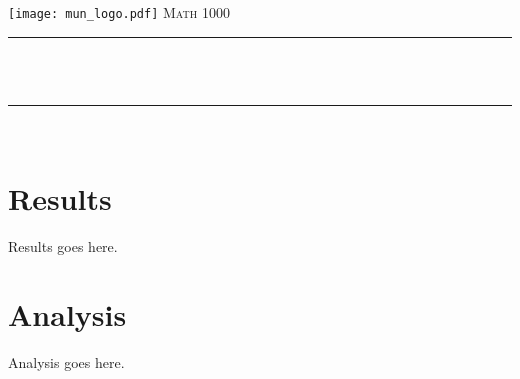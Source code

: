 \documentclass[12pt,oneside,oldfontcommands]{memoir}
\makeatletter
\def\maketitle{%
  \null
  \thispagestyle{empty}
  \begin{center}\leavevmode
       \normalfont
       \texttt{[image: mun\_logo.pdf]}
       \vskip 0.5cm   
       \textsc{\Large Math 1000}\\[0.5 cm]
	     {\large \@date\par}
       \vskip 1.0cm
	\rule{\linewidth}{0.2 mm} \\[0.4 cm]
	{ \huge \bfseries \@title}\\
	\rule{\linewidth}{0.2 mm} \\[1.5 cm]
   \end{center}
   \vfill
   \null
   \cleardoublepage
  }
\makeatother
\begin{document}
\maketitle
\frontmatter
\let\cleardoublepage\clearpage
\mainmatter
\sloppy







\section*{Results}
Results goes here. 


\section*{Analysis}
Analysis goes here. 
\end{document}
